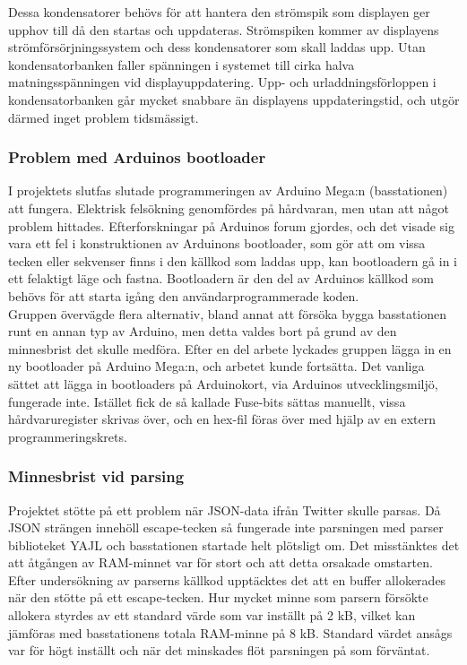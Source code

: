 \documentclass[a4paper,11pt]{article}
\begin{document}
Dessa kondensatorer behövs för att hantera den strömspik som displayen ger upphov till då den startas och uppdateras. Strömspiken kommer av displayens strömförsörjningssystem och dess kondensatorer som skall laddas upp. Utan kondensatorbanken faller spänningen i systemet till cirka halva matningsspänningen vid displayuppdatering. Upp- och urladdningsförloppen i kondensatorbanken går mycket snabbare än displayens uppdateringstid, och utgör därmed inget problem tidsmässigt.

\subsubsection{Problem med Arduinos bootloader}
I projektets slutfas slutade programmeringen av Arduino Mega:n (basstationen) att fungera. Elektrisk felsökning genomfördes på hårdvaran, men utan att något problem hittades. Efterforskningar på Arduinos forum gjordes, och det visade sig vara ett fel i konstruktionen av Arduinons bootloader, som gör att om vissa tecken eller sekvenser finns i den källkod som laddas upp, kan bootloadern gå in i ett felaktigt läge och fastna. Bootloadern är den del av Arduinos källkod som behövs för att starta igång den användarprogrammerade koden. \\

Gruppen övervägde flera alternativ, bland annat att försöka bygga basstationen runt en annan typ av Arduino, men detta valdes bort på grund av den minnesbrist det skulle medföra. Efter en del arbete lyckades gruppen lägga in en ny bootloader på Arduino Mega:n, och arbetet kunde fortsätta. Det vanliga sättet att lägga in bootloaders på Arduinokort, via Arduinos utvecklingsmiljö, fungerade inte. Istället fick de så kallade Fuse-bits sättas manuellt, vissa hårdvaruregister skrivas över, och en hex-fil föras över med hjälp av en extern programmeringskrets.

\subsubsection{Minnesbrist vid parsing}
Projektet stötte på ett problem när JSON-data ifrån Twitter skulle parsas. Då JSON strängen innehöll escape-tecken så fungerade inte parsningen med parser biblioteket YAJL och basstationen startade helt plötsligt om. Det misstänktes det att åtgången av RAM-minnet var för stort och att detta orsakade omstarten. Efter undersökning av parserns källkod upptäcktes det att en buffer allokerades när den stötte på ett escape-tecken. Hur mycket minne som parsern försökte allokera styrdes av ett standard värde som var inställt på 2 kB, vilket kan jämföras med basstationens totala RAM-minne på 8 kB. Standard värdet ansågs var för högt inställt och när det minskades flöt parsningen på som förväntat.
\end{document}

